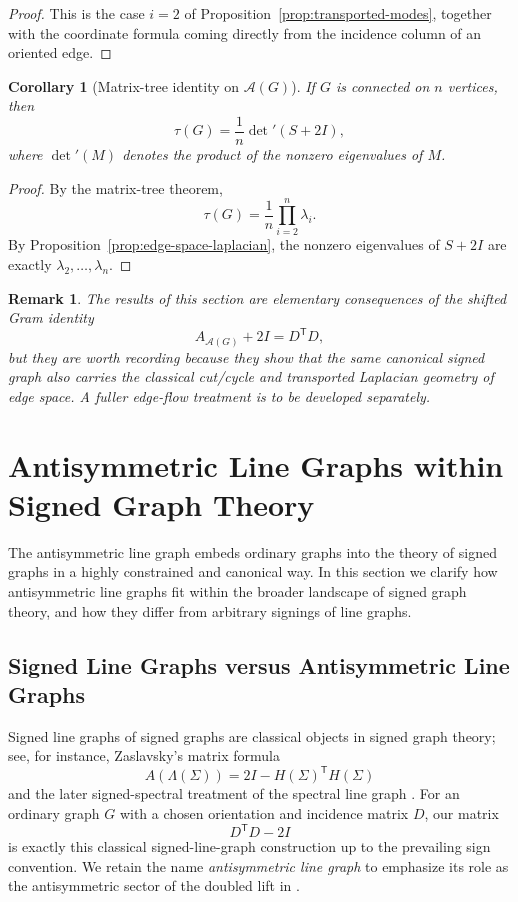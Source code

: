 \documentclass[11pt]{article}
\newtheorem{corollary}{Corollary}
\newtheorem{remark}{Remark}
\theoremstyle{plain}
\begin{document}
\begin{proof}
This is the case $i=2$ of Proposition~\ref{prop:transported-modes}, together with
the coordinate formula coming directly from the incidence column of an oriented
edge.
\end{proof}

\begin{corollary}[Matrix-tree identity on $\mathcal A(G)$]
\label{cor:matrix-tree}
If $G$ is connected on $n$ vertices, then
\[
\tau(G)=\frac1n\det\nolimits'(S+2I),
\]
where $\det'(M)$ denotes the product of the nonzero eigenvalues of $M$.
\end{corollary}

\begin{proof}
By the matrix-tree theorem,
\[
\tau(G)=\frac1n\prod_{i=2}^n\lambda_i.
\]
By Proposition~\ref{prop:edge-space-laplacian}, the nonzero eigenvalues of
$S+2I$ are exactly $\lambda_2,\dots,\lambda_n$.
\end{proof}

\begin{remark}\label{rem:laplacian-geometry-role}
The results of this section are elementary consequences of the shifted Gram
identity
\[
A_{\mathcal A(G)}+2I=D^{\mathsf T}D,
\]
but they are worth recording because they show that the same canonical signed
graph also carries the classical cut/cycle and transported Laplacian geometry of
edge space.
A fuller edge-flow treatment is to be developed separately.
\end{remark}

\section{Antisymmetric Line Graphs within Signed Graph Theory}
\label{sec:signed-class}

The antisymmetric line graph embeds ordinary graphs into the theory of signed
graphs in a highly constrained and canonical way.
In this section we clarify how antisymmetric line graphs fit within the broader
landscape of signed graph theory, and how they differ from arbitrary signings of
line graphs.

\subsection{Signed Line Graphs versus Antisymmetric Line Graphs}

Signed line graphs of signed graphs are classical objects in signed graph theory;
see, for instance, Zaslavsky's matrix formula
\[
A(\Lambda(\Sigma))=2I-H(\Sigma)^{\mathsf T}H(\Sigma)
\]
and the later signed-spectral treatment of the spectral line graph
\cite{Zaslavsky2010Matrices,GerminaHameedZaslavsky2011,BelardoPisanskiStanicZaslavsky2023}.
For an ordinary graph $G$ with a chosen orientation and incidence matrix $D$,
our matrix
\[
D^{\mathsf T}D-2I
\]
is exactly this classical signed-line-graph construction up to the prevailing
sign convention. We retain the name \emph{antisymmetric line graph} to emphasize
its role as the antisymmetric sector of the doubled lift in \cite{BalHL}.
\end{document}
